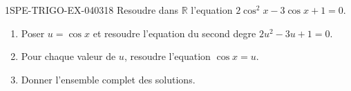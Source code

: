 \begin{exercice}{1SPE-TRIGO-EX-040}{3}{18}
Resoudre dans $\mathbb{R}$ l'equation $2\cos^2 x - 3\cos x + 1 = 0$.

\begin{enumerate}
  \item Poser $u = \cos x$ et resoudre l'equation du second degre $2u^2 - 3u + 1 = 0$.
  \item Pour chaque valeur de $u$, resoudre l'equation $\cos x = u$.
  \item Donner l'ensemble complet des solutions.
\end{enumerate}
\end{exercice}
